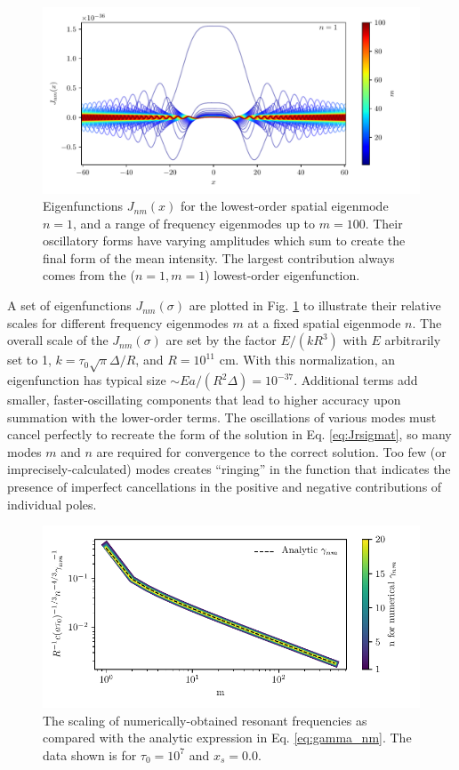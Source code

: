 \documentclass{aastex63}
\begin{document}
\begin{figure}
    \centering
    \includegraphics{Jsoln_n1_m100.pdf}
    \caption{Eigenfunctions $J_{nm}(x)$ for the lowest-order spatial eigenmode $n=1$, and a range of frequency eigenmodes up to $m=100$. Their oscillatory forms have varying amplitudes which sum to create the final form of the mean intensity. The largest contribution always comes from the ($n=1, m=1$) lowest-order eigenfunction.}
    \label{fig:jsoln}
\end{figure}
A set of eigenfunctions $J_{nm}(\sigma)$ are plotted in Fig. \ref{fig:jsoln} to illustrate their relative scales for different frequency eigenmodes $m$ at a fixed spatial eigenmode $n$. The overall scale of the $J_{nm}(\sigma)$ are set by the factor $E/(kR^3)$ with $E$ arbitrarily set to 1, $k = \tau_0 \sqrt{\pi} \Delta / R$, and $R = 10^{11}$ cm. With this normalization, an eigenfunction has typical size ${\sim} E a / \left(R^2 \Delta \right) = 10^{-37}$. Additional terms add smaller, faster-oscillating components that lead to higher accuracy upon summation with the lower-order terms. The oscillations of various modes must cancel perfectly to recreate the form of the solution in Eq. \ref{eq:Jrsigmat}, so many modes $m$ and $n$ are required for convergence to the correct solution. Too few (or imprecisely-calculated) modes creates ``ringing'' in the function that indicates the presence of imperfect cancellations in the positive and negative contributions of individual poles. 
\begin{figure}
    \centering
    \includegraphics[width=\textwidth]{gamma_nm.pdf}
    \caption{The scaling of numerically-obtained resonant frequencies as compared with the analytic expression in Eq. \ref{eq:gamma_nm}. The data shown is for $\tau_0=10^7$ and $x_s=0.0$.}
    \label{fig:gamma_nm}
\end{figure}
\end{document}
